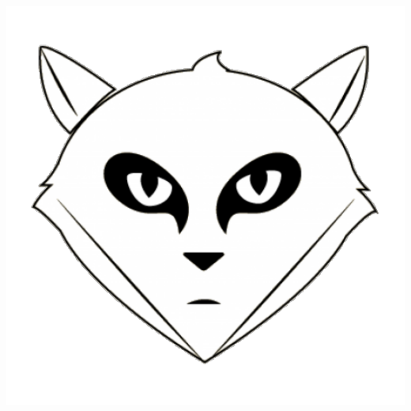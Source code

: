 \begin{frame}
\begin{itemize}
\includegraphics[scale=0.08]{doc/Presentation/image/gitlab.pdf}
\end{itemize}
\end{frame}
